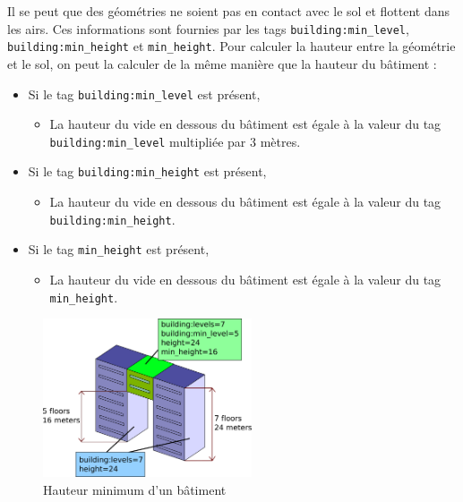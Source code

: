 Il se peut que des géométries ne soient pas en contact avec le sol et flottent dans les airs. Ces informations sont fournies par les tags \texttt{building:min\_level}, \texttt{building:min\_height} et \texttt{min\_height}. Pour calculer la hauteur entre la géométrie et le sol, on peut la calculer de la même manière que la hauteur du bâtiment :

\begin{itemize}
    \item Si le tag \texttt{building:min\_level} est présent,
        \begin{itemize}
            \item La hauteur du vide en dessous du bâtiment est égale à la valeur du tag \texttt{building:min\_level} multipliée par 3 mètres.
        \end{itemize}
    \item Si le tag \texttt{building:min\_height} est présent,
        \begin{itemize}
            \item La hauteur du vide en dessous du bâtiment est égale à la valeur du tag \texttt{building:min\_height}.
        \end{itemize}
    \item Si le tag \texttt{min\_height} est présent,
        \begin{itemize}
            \item La hauteur du vide en dessous du bâtiment est égale à la valeur du tag \texttt{min\_height}.
        \end{itemize}
\end{itemize}

\begin{figure}[H]
    \centering
    \includegraphics[width=0.55\textwidth]{assets/figures/Minlevel.svg}
    \caption{Hauteur minimum d'un bâtiment \cite{MinLevel-image}}
    \label{fig:building-Minlevel}
\end{figure}

